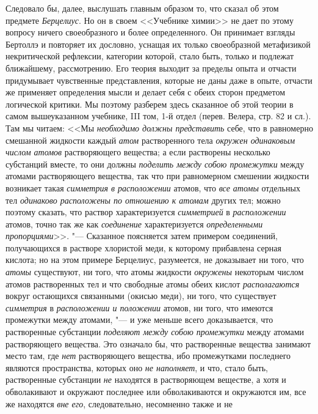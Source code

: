Следовало бы, далее, выслушать главным образом то, что сказал об этом
предмете {\em Берцелиус}. Но он в своем <<Учебнике
химии>>
не дает по этому вопросу ничего своеобразного и более определенного. Он
принимает взгляды Бертоллэ и повторяет их дословно, уснащая их только
своеобразной метафизикой некритической рефлексии, категории которой, стало
быть, только и подлежат ближайшему, рассмотрению. Его теория выходит за
пределы опыта и отчасти придумывает чувственные представления, которые не
даны даже в опыте, отчасти же применяет определения мысли и делает себя с
обеих сторон предметом логической критики. Мы поэтому разберем здесь
сказанное об этой теории в самом вышеуказанном учебнике, III том, 1-й отдел
(перев. Велера, стр. 82 и сл.). Там мы читаем: <<Мы
{\em необходимо должны представить} себе, что в
равномерно смешанной жидкости каждый {\em атом}
растворенного тела {\em окружен одинаковым числом
атомов} растворяющего вещества; а если растворены несколько субстанций
вместе, то они должны {\em поделить между собою
промежутки} между атомами растворяющего вещества, так что при равномерном
смешении жидкости возникает такая {\em симметрия в
расположении} атомов, что {\em все атомы} отдельных тел
{\em одинаково расположены по отношению к атомам}
других тел; можно поэтому сказать, что раствор характеризуется
{\em симметрией} в
{\em расположении} атомов, точно так же как
{\em соединение} характеризуется
{\em определенными пропорциями}>>. "--- Сказанное
поясняется затем примером соединений, получающихся в растворе хлористой
меди, к которому прибавлена серная кислота; но на этом примере Берцелиус,
разумеется, не доказывает ни того, что {\em атомы}
существуют, ни того, что атомы жидкости {\em окружены}
некоторым числом атомов растворенных тел и что свободные атомы обеих кислот
{\em располагаются} вокруг остающихся связанными
(окисью меди), ни того, что существует {\em симметрия}
в {\em расположении и положении} атомов, ни того, что
имеются промежутки между атомами, "--- и уже меньше всего доказывается, что
растворенные субстанции {\em поделяют между собою
промежутки} между атомами растворяющего вещества. Это означало бы, что
растворенные вещества занимают место там, где {\em нет}
растворяющего вещества, ибо промежутками последнего являются пространства,
которых оно {\em не наполняет}, и что, стало быть,
растворенные субстанции {\em не} находятся в
растворяющем веществе, а хотя и обволакивают и окружают последнее или
обволакиваются и окружаются им, все же находятся
{\em вне его}, следовательно, несомненно также и не
